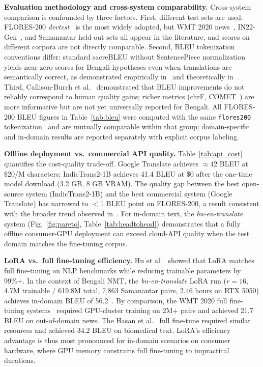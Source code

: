 \documentclass[conference]{IEEEtran}
\begin{document}
\textbf{Evaluation methodology and cross-system comparability.}
Cross-system comparison is confounded by three factors.
First, different test sets are used: FLORES-200 \textit{devtest}~\cite{nllb2022}
is the most widely adopted, but WMT 2020 news~\cite{barrault2020wmt},
IN22-Gen~\cite{gala2023indictrans2}, and Samanantar held-out sets all appear
in the literature, and scores on different corpora are not directly comparable.
Second, BLEU tokenization conventions differ: standard sacreBLEU without
SentencePiece normalization yields near-zero scores for Bengali hypotheses even
when translations are semantically correct, as demonstrated empirically
in~\cite{biswas2025bnentr} and theoretically in~\cite{post2018sacrebleu}.
Third, Callison-Burch et al.~\cite{callison2006re} demonstrated that BLEU
improvements do not reliably correspond to human quality gains; richer metrics
(chrF, COMET~\cite{rei2020comet}) are more informative but are not yet
universally reported for Bengali.
All FLORES-200 BLEU figures in Table~\ref{tab:bleu} were computed with the
same \texttt{flores200} tokenization~\cite{nllb2022} and are mutually comparable
within that group; domain-specific and in-domain results are reported separately
with explicit corpus labeling.

\textbf{Offline deployment vs.\ commercial API quality.}
Table~\ref{tab:api_cost} quantifies the cost-quality trade-off.
Google Translate achieves $\approx$42 BLEU at \$20/M characters; IndicTrans2-1B
achieves 41.4 BLEU at \$0 after the one-time model download (3.2 GB, 8 GB VRAM).
The quality gap between the best open-source system (IndicTrans2-1B) and the
best commercial system (Google Translate) has narrowed to $<$1 BLEU point on
FLORES-200, a result consistent with the broader trend observed
in~\cite{nllb2022}.
For in-domain text, the \textit{bn-en-translate} system (Fig.~\ref{fig:pareto},
Table~\ref{tab:headtohead}) demonstrates that a fully offline consumer-GPU
deployment can exceed cloud-API quality when the test domain matches the
fine-tuning corpus.

\textbf{LoRA vs.\ full fine-tuning efficiency.}
Hu et al.~\cite{hu2022lora} showed that LoRA matches full fine-tuning on NLP
benchmarks while reducing trainable parameters by 99\%+.
In the context of Bengali NMT, the \textit{bn-en-translate} LoRA run ($r=16$,
4.7M trainable / 619.8M total, 7,863 Samanantar pairs, 2.46 hours on RTX 5050)
achieves in-domain BLEU of 56.2~\cite{biswas2025bnentr}.
By comparison, the WMT 2020 full fine-tuning systems~\cite{barrault2020wmt}
required GPU-cluster training on 2M+ pairs and achieved 21.7 BLEU on
out-of-domain news.
The Hasan et al.~\cite{hasan2020low} full fine-tune required similar resources
and achieved 34.2 BLEU on biomedical text.
LoRA's efficiency advantage is thus most pronounced for in-domain scenarios
on consumer hardware, where GPU memory constrains full fine-tuning to impractical
durations.
\end{document}
